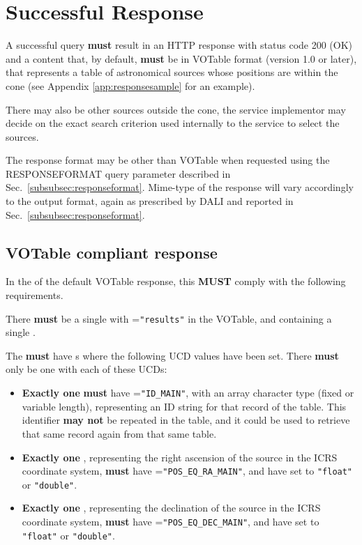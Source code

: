 \documentclass[11pt,a4paper]{ivoa}
\begin{document}
\section{Successful Response}
\label{sec:response}
A successful query \textbf{must} result in an HTTP response with status code 200 (OK) and a content that, by default, \textbf{must} be in VOTable format (version 1.0 or later), that represents a table of astronomical sources whose positions are within the cone (see Appendix \ref{app:responsesample} for an example).  

There may also be other sources outside the cone, the service implementor may decide on the exact search criterion used internally to the service to select the sources.

The response format may be other than VOTable when requested using the RESPONSEFORMAT query parameter described in Sec.~\ref{subsubsec:responseformat}. Mime-type of the response will vary accordingly to the output format, again as prescribed by DALI and reported in Sec.~\ref{subsubsec:responseformat}.

\subsection{VOTable compliant response}

In the of the default VOTable response, this \textbf{MUST} comply with the following requirements.

There \textbf{must} be a single  with =\texttt{"results"} in the VOTable, and containing a single .

The  \textbf{must} have s where the following UCD values have been set. There \textbf{must} only be one  with each of these UCDs:
\begin{itemize}
	\item \textbf{Exactly one}  \textbf{must} have =\texttt{"ID\_MAIN"}, with an array character type (fixed or variable length), representing an ID string for that record of the table. This identifier \textbf{may not} be repeated in the table, and it could be used to retrieve that same record again from that same table.
	\item \textbf{Exactly one} , representing the right ascension of the source in the ICRS coordinate system, \textbf{must} have =\texttt{"POS\_EQ\_RA\_MAIN"}, and have  set to \texttt{"float"} or \texttt{"double"}.
	\item \textbf{Exactly one} , representing the declination of the source in the ICRS coordinate system, \textbf{must} have =\texttt{"POS\_EQ\_DEC\_MAIN"}, and have  set to \texttt{"float"} or \texttt{"double"}.
\end{itemize}
\end{document}
